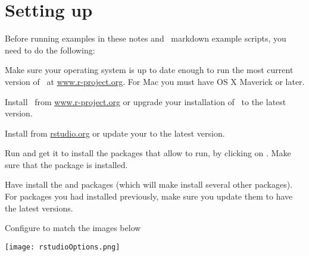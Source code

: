 \section{Setting up \R}
Before running examples in these notes and \R\ markdown example
scripts, you need to do the following:
\be
\item Make sure your operating system is up to date enough to run the
  most current version of \R\ at \href{https://www.r-project.org/}{www.r-project.org}.  For Mac you
  must have OS X Maverick or later.
\item Install \R\ from \href{https://www.r-project.org/}{www.r-project.org} or upgrade your
  installation of \R\ to the latest version.
\item Install  from \href{https://www.rstudio.com/}{rstudio.org} or update your
   to the latest version.
\item Run  and get it to install the packages that allow
   to run, by clicking on .  Make sure that the  package is installed.
\item Have  install the  and  packages
  (which will make  install several other packages).  For
  packages you had installed previously, make sure you update them to
  have the latest versions.
\item Configure   to match
  the images below
  
\centerline{\texttt{[image: rstudioOptions.png]}}

\bigskip

